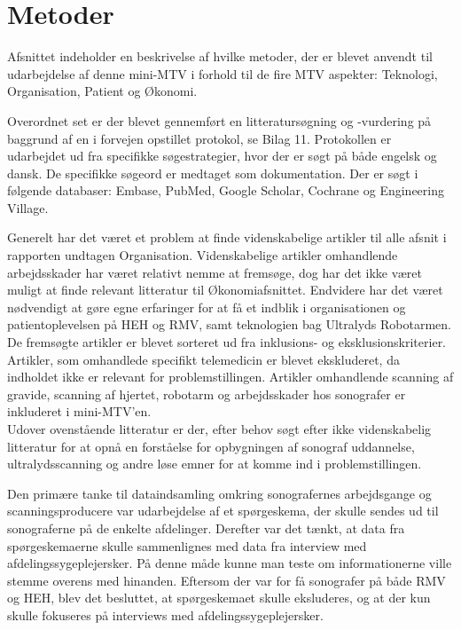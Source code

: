 \chapter{Metoder}
Afsnittet indeholder en beskrivelse af hvilke metoder, der er blevet anvendt til udarbejdelse af denne mini-MTV i forhold til de fire MTV aspekter: Teknologi, Organisation, Patient og Økonomi.

Overordnet set er der blevet gennemført en litteratursøgning og -vurdering på baggrund af en i forvejen opstillet protokol, se Bilag 11. Protokollen er udarbejdet ud fra specifikke søgestrategier, hvor der er søgt på både engelsk og dansk. De specifikke søgeord er medtaget som dokumentation. Der er søgt i følgende databaser: Embase, PubMed, Google Scholar, Cochrane og Engineering Village. 

Generelt har det været et problem at finde videnskabelige artikler til alle afsnit i rapporten undtagen Organisation. Videnskabelige artikler omhandlende arbejdsskader har været relativt nemme at fremsøge, dog har det ikke været muligt at finde relevant litteratur til Økonomiafsnittet. Endvidere har det været nødvendigt at gøre egne erfaringer for at få et indblik i organisationen og patientoplevelsen på HEH og RMV, samt teknologien bag Ultralyds Robotarmen.\\
De fremsøgte artikler er blevet sorteret ud fra inklusions- og eksklusionskriterier. Artikler, som omhandlede specifikt telemedicin er blevet ekskluderet, da indholdet ikke er relevant for problemstillingen. Artikler omhandlende scanning af gravide, scanning af hjertet, robotarm og arbejdsskader hos sonografer er inkluderet i mini-MTV’en.\\
Udover ovenstående litteratur er der, efter behov søgt efter ikke videnskabelig litteratur for at opnå en forståelse for opbygningen af sonograf uddannelse, ultralydsscanning og andre løse emner for at komme ind i problemstillingen. 

Den primære tanke til dataindsamling omkring sonografernes arbejdsgange og scanningsproducere var udarbejdelse af et spørgeskema, der skulle sendes ud til sonograferne på de enkelte afdelinger. Derefter var det tænkt, at data fra spørgeskemaerne skulle sammenlignes med data fra interview med afdelingssygeplejersker. På denne måde kunne man teste om informationerne ville stemme overens med hinanden. Eftersom der var for få sonografer på både RMV og HEH, blev det besluttet, at spørgeskemaet skulle eksluderes, og at der kun skulle fokuseres på interviews med afdelingssygeplejersker.

